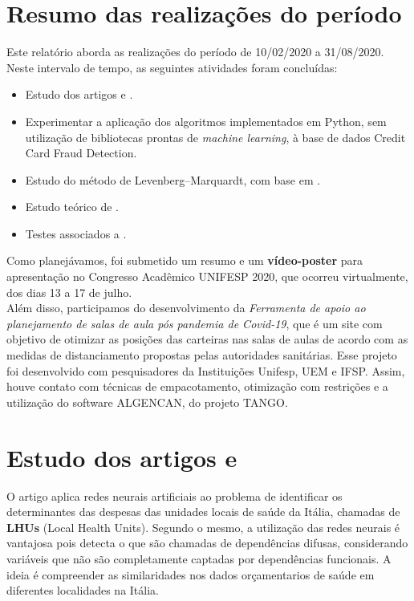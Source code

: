 \documentclass[11pt]{article}
\begin{document}
\section*{Resumo das realizações do período}
Este relatório aborda as realizações do período de 10/02/2020 a 31/08/2020. Neste intervalo de tempo, as seguintes atividades foram concluídas:

\begin{itemize}
\item Estudo dos artigos \cite{fraudeItalia1} e \cite{fraudeItalia2}.
\item Experimentar a aplicação dos algoritmos implementados em Python, sem utilização de bibliotecas prontas de \textit{machine learning}, à base de dados Credit Card Fraud Detection.

\item Estudo do método de Levenberg–Marquardt, com base em \cite{TCCKleber}.
\item Estudo teórico de \cite{bmLS}. 
\item Testes associados a \cite{bmLS}.
\end{itemize}

\noindent
Como planejávamos, foi submetido um resumo e um \textbf{vídeo-poster} para apresentação no Congresso Acadêmico UNIFESP 2020, que ocorreu virtualmente, dos dias 13 a 17 de julho.\\

\noindent
Além disso, participamos do desenvolvimento da \textit{Ferramenta de apoio ao planejamento de salas de aula pós pandemia de Covid-19}, que é um site com objetivo de otimizar as posições das carteiras nas salas de aulas de acordo com as medidas de distanciamento propostas pelas autoridades sanitárias. Esse projeto foi desenvolvido com pesquisadores da Instituições Unifesp, UEM e IFSP. Assim, houve contato com técnicas de empacotamento, otimização com restrições e a utilização do software ALGENCAN, do projeto TANGO\supercite{TANGO}.
\newpage
\section{Estudo dos artigos \cite{fraudeItalia1} e \cite{fraudeItalia2}}
O artigo \cite{fraudeItalia1} aplica redes neurais artificiais ao problema de identificar os determinantes das despesas das unidades locais de saúde da Itália, chamadas de \textbf{LHUs} (Local Health Units). Segundo o mesmo, a utilização das redes neurais é vantajosa pois detecta o que são chamadas de dependências difusas, considerando variáveis que não são completamente captadas por dependências funcionais. A ideia é compreender as similaridades nos dados orçamentarios de saúde em diferentes localidades na Itália.\\
\end{document}
